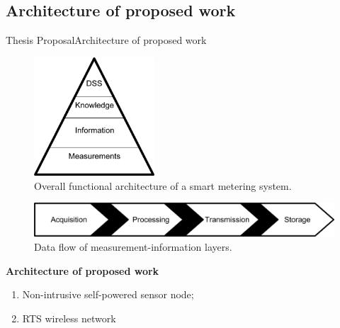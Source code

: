 \subsection{Architecture of proposed work}

\begin{frame}{Thesis Proposal}{Architecture of proposed work}
	
	\begin{minipage}[t]{0.48\linewidth}
\vspace{-2em}
		\begin{figure}[ht!]
			\centering
			\includegraphics[width=0.4\textwidth,keepaspectratio]{figures/40.Method/pyramid}
			\caption{Overall functional architecture of a smart metering system.}
		\end{figure}

	\end{minipage}\hfill
	\begin{minipage}[t]{0.48\linewidth}
		
		\vspace{2em}
		\begin{figure}[ht!]
			\centering

			\includegraphics[width=\textwidth,keepaspectratio]{figures/40.Method/data_flow}
			\caption{Data flow of measurement-information layers.}
		\end{figure}
	\end{minipage}

\begin{block}{\textbf{Architecture of proposed work}}
	
		\begin{enumerate}
		\item  Non-intrusive self-powered sensor node;
		\item  RTS wireless network
	\end{enumerate}
		
	
		

	
\end{block}
\end{frame}

